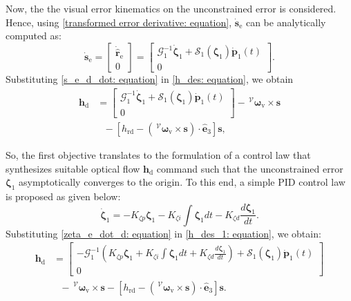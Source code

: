 \documentclass[lettersize,journal]{IEEEtran}
\begin{document}
Now, the the visual error kinematics on the unconstrained error is considered. Hence, using \eqref{transformed error derivative: equation}, $\dot{\boldsymbol{s}}_\text{e}$ can be analytically computed as:
\begin{equation} \label{s_e_d_dot: equation}
    \dot{\boldsymbol{s}}_\text{e} = \begin{bmatrix} \dot{\hat{\boldsymbol{r}}}_{\text{e}} \\ 0 \end{bmatrix} = \begin{bmatrix} \mathcal{G}_1^{-1} \dot{\boldsymbol{\zeta}}_{1} + \mathcal{S}_1(\boldsymbol{\zeta}_1) \dot{\boldsymbol{p}}_1(t) \\ 0 \end{bmatrix}.   
\end{equation}
Substituting \eqref{s_e_d_dot: equation} in \eqref{h_des: equation}, we obtain
\begin{align} \label{h_des_1: equation}
    \boldsymbol{h}_\text{d} &= \begin{bmatrix} \mathcal{G}_1^{-1} \dot{\boldsymbol{\zeta}}_{1} + \mathcal{S}_1(\boldsymbol{\zeta}_1) \dot{\boldsymbol{p}}_1(t) \\ 0 \end{bmatrix} - \,^\mathcal{V} \boldsymbol{\omega}_{\text{v}} \times \boldsymbol{s} \nonumber \\
    &~~~ - \left[h_\text{rd} - \left(\,^\mathcal{V} \boldsymbol{\omega}_{\text{v}} \times \boldsymbol{s} \right) \cdot \hat{\boldsymbol{e}}_3 \right] \boldsymbol{s},
\end{align}

So, the first objective translates to the formulation of a control law that synthesizes suitable optical flow $\boldsymbol{h}_\text{d}$ command such that the unconstrained error $\boldsymbol{\zeta}_{1}$ asymptotically converges to the origin. To this end, a simple PID control law is proposed as given below:
\begin{equation} \label{zeta_e_dot_d: equation}
    \dot{\boldsymbol{\zeta}}_{1} = - K_{\zeta p} \boldsymbol{\zeta}_{1} - K_{\zeta i} \int \boldsymbol{\zeta}_{1} dt - K_{\zeta d} \frac{d\boldsymbol{\zeta}_{1}}{dt}.
\end{equation}
Substituting \eqref{zeta_e_dot_d: equation} in \eqref{h_des_1: equation}, we obtain:
\begin{align} \label{h_des_2: equation}
    \boldsymbol{h}_\text{d} &= \begin{bmatrix} - \mathcal{G}_1^{-1} \left(K_{\zeta p} \boldsymbol{\zeta}_{1} + K_{\zeta i} \int \boldsymbol{\zeta}_{1} dt + K_{\zeta d} \frac{d\boldsymbol{\zeta}_{1}}{dt}\right) + \mathcal{S}_1(\boldsymbol{\zeta}_1) \dot{\boldsymbol{p}}_1(t) \\ 0 \end{bmatrix} \nonumber \\
    &~~~ - \,^\mathcal{V} \boldsymbol{\omega}_{\text{v}} \times \boldsymbol{s} - \left[h_\text{rd} - \left(\,^\mathcal{V} \boldsymbol{\omega}_{\text{v}} \times \boldsymbol{s} \right) \cdot \hat{\boldsymbol{e}}_3 \right] \boldsymbol{s}.
\end{align}
\end{document}
